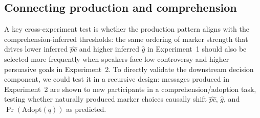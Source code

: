 \documentclass[12pt]{article}
\begin{document}
\subsection{Connecting production and comprehension}

A key cross-experiment test is whether the production pattern aligns with the comprehension-inferred thresholds: the same ordering of marker strength that drives lower inferred $\widehat{pc}$ and higher inferred $\widehat{g}$ in Experiment~1 should also be selected more frequently when speakers face low controversy and higher persuasive goals in Experiment~2. To directly validate the downstream decision component, we could test it in a recursive design: messages produced in Experiment~2 are shown to new participants in a comprehension/adoption task, testing whether naturally produced marker choices causally shift $\widehat{pc}$, $\widehat{g}$, and $\Pr(\mathrm{Adopt}(q))$ as predicted.
\end{document}
